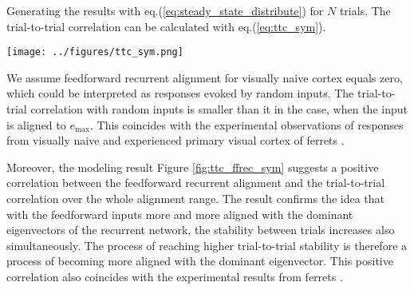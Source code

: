 \documentclass[11pt]{article}
\begin{document}
	Generating the results with eq.(\ref{eq:steady_state_distribute}) for $N$ trials. The trial-to-trial correlation can be calculated with eq.(\ref{eq:ttc_sym}). 

		\begin{SCfigure}[0.9][h] 
			\centering
			\caption[Correlation between feedforward recurrent alignment and trial to trial correlation for symmetric RNNs]{\textbf{Correlation between feedforward recurrent alignment and trial to trial correlation for symmetric RNNs.} Inputs aligned to eigenvectors $e_i$ of interaction matrix $J$ in the ascending order of eigenvalues eq.(\ref{eq:ascending_order}), resulting the feedforward recurrent alignment varies approximately between $\lambda_{\text{min}}$ and $\lambda_{\text{max}}$. For each input alignment to an eigenvector, $N=100$ trials of evoked responses were generated for calculation of the trial-to-trial correlation calculated with eq.(\ref{eq:ttc_sym}).}
			\texttt{[image: ../figures/ttc\_sym.png]}
			\label{fig:ttc_ffrec_sym}
		\end{SCfigure}
	
	We assume feedforward recurrent alignment for visually naive cortex equals zero, which could be interpreted as responses evoked by random inputs. The trial-to-trial correlation with random inputs is smaller than it in the case, when the input is aligned to $e_{\text{max}}$. This coincides with the experimental observations of responses from visually naive and experienced primary visual cortex of ferrets \cite{tragenap2023nature}. 
	
	Moreover, the modeling result Figure \ref{fig:ttc_ffrec_sym} suggests a positive correlation between the feedforward recurrent alignment and the trial-to-trial correlation over the whole alignment range. The result confirms the idea that with the feedforward inputs more and more aligned with the dominant eigenvectors of the recurrent network, the stability between trials increases also simultaneously. The process of reaching higher trial-to-trial stability is therefore a process of becoming more aligned with the dominant eigenvector. 
	This positive correlation also coincides with the experimental results from ferrets \cite{tragenap2023nature}.
	
	
\end{document}

